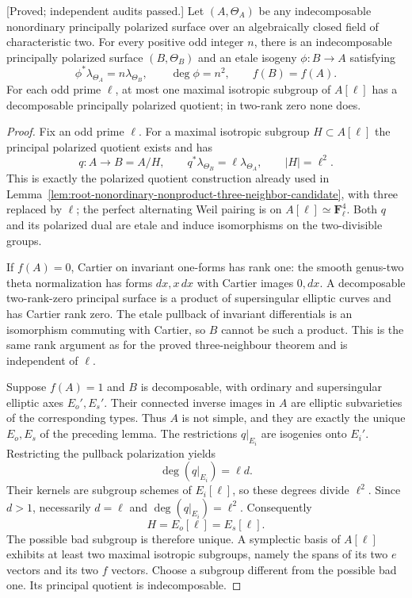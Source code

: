 \begin{theorem}
\label{thm:nonordinary-arbitrary-odd-neighbor-candidate}
\textup{[Proved; independent audits passed.]}
Let $(A,\Theta_A)$ be any indecomposable nonordinary principally
polarized surface over an algebraically closed field of
characteristic two. For every positive odd integer $n$, there is an
indecomposable principally polarized surface $(B,\Theta_B)$ and an
etale isogeny $\phi:B\to A$ satisfying
\[
 \phi^*\lambda_{\Theta_A}=n\lambda_{\Theta_B},
 \qquad \deg\phi=n^2,\qquad f(B)=f(A).
\]
For each odd prime $\ell$, at most one maximal isotropic subgroup
of $A[\ell]$ has a decomposable principally polarized quotient;
in two-rank zero none does.
\end{theorem}

\begin{proof}
Fix an odd prime $\ell$. For a maximal isotropic subgroup
$H\subset A[\ell]$ the principal polarized quotient exists and has
\[
 q:A\longrightarrow B=A/H,\qquad
 q^*\lambda_{\Theta_B}=\ell\lambda_{\Theta_A},\qquad
 |H|=\ell^2.
\]
This is exactly the polarized quotient construction already used
in Lemma~\ref{lem:root-nonordinary-nonproduct-three-neighbor-candidate},
with three replaced by $\ell$; the perfect alternating Weil pairing
is on $A[\ell]\simeq\mathbf F_\ell^4$. Both $q$ and its polarized
dual are etale and induce isomorphisms on the two-divisible groups.

If $f(A)=0$, Cartier on invariant one-forms has rank one: the
smooth genus-two theta normalization has forms $dx,x\,dx$ with
Cartier images $0,dx$. A decomposable two-rank-zero principal
surface is a product of supersingular elliptic curves and has
Cartier rank zero. The etale pullback of invariant differentials
is an isomorphism commuting with Cartier, so $B$ cannot be such
a product. This is the same rank argument as for the proved
three-neighbour theorem and is independent of $\ell$.

Suppose $f(A)=1$ and $B$ is decomposable, with ordinary and
supersingular elliptic axes $E_o',E_s'$. Their connected inverse
images in $A$ are elliptic subvarieties of the corresponding types.
Thus $A$ is not simple, and they are exactly the unique $E_o,E_s$
of the preceding lemma. The restrictions $q|_{E_i}$ are isogenies
onto $E_i'$. Restricting the pullback polarization yields
\[
                    \deg(q|_{E_i})=\ell d.
\]
Their kernels are subgroup schemes of $E_i[\ell]$, so these degrees
divide $\ell^2$. Since $d>1$, necessarily $d=\ell$ and
$\deg(q|_{E_i})=\ell^2$. Consequently
\[
                         H=E_o[\ell]=E_s[\ell].
\]
The possible bad subgroup is therefore unique. A symplectic basis
of $A[\ell]$ exhibits at least two maximal isotropic subgroups,
namely the spans of its two $e$ vectors and its two $f$ vectors.
Choose a subgroup different from the possible bad one. Its
principal quotient is indecomposable.


\end{proof}

